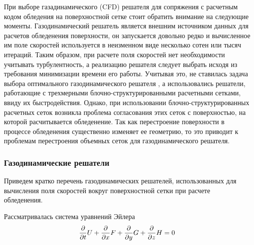 При выборе газадинамического (CFD\label{abbr:cfd-2}) решателя для сопряжения с расчетным кодом обледения на поверхностной сетке стоит обратить внимание на следующие моменты.
Газодинамический решатель является внешним источником данных для расчетов обледенения поверхности, он запускается довольно редко и вычисленное им поле скоростей используется в неизменном виде несколько сотен или тысяч итераций.
Таким образом, при расчете поля скоростей нет необходимости учитывать турбулентность, а реализацию решателя следует выбрать исходя из требования минимизации времени его работы.
Учитывая это, не ставилась задача выбора оптимального газодинамического решателя \cite{Blazek2015CFD}, а использовались решатели, работающие с трехмерными блочно-структурированными расчетными сетками, ввиду их быстродействия.
Однако, при использовании блочно-структурированных расчетных сеток возникла проблема согласования этих сеток с поверхностью, на которой расчитывается обледенение.
Так как перестроение поверхности в процессе обледенения существенно изменяет ее геометрию, то это приводит к проблемам перестроения объемных сеток для газодинамического решателя.

\subsubsection{Газодинамические решатели}

Приведем кратко перечень газодинамических решателей, использованных для вычисления поля скоростей вокруг поверхностной сетки при расчете обледенения.

Рассматривалась система уравнений Эйлера \cite{Kulikovsky2001Gas}
\begin{equation}\label{eqn:text_1_gas_system}
	\frac{\partial}{\partial t} U + \frac{\partial}{\partial x} F + \frac{\partial}{\partial y} G + \frac{\partial}{\partial z} H = 0 \\
\end{equation}


